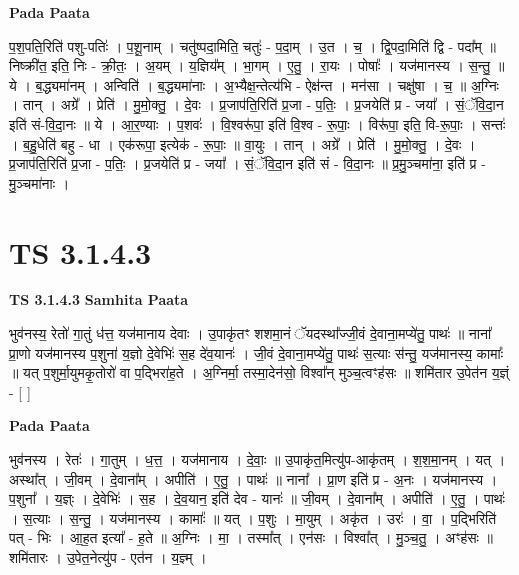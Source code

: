 \documentclass[17pt]{extarticle}
\begin{document}
\textbf{Pada Paata} \newline

प॒श॒पति॒रिति॑ पशु-पतिः॑ । प॒शू॒नाम् । चतु॑ष्पदा॒मिति॒ चतुः॑ - प॒दा॒म् । उ॒त । च॒ । द्वि॒पदा॒मिति॑ द्वि - पदा᳚म् ॥ निष्क्री॑त॒ इति॒ निः - क्री॒तः॒ । अ॒यम् । य॒ज्ञिय᳚म् । भा॒गम् । ए॒तु॒ । रा॒यः । पोषाः᳚ । यज॑मानस्य । स॒न्तु॒ ॥ ये । ब॒द्ध्यमा॑नम् । अन्विति॑ । ब॒द्ध्यमा॑नाः । अ॒भ्यैक्ष॒न्तेत्य॑भि - ऐक्ष॑न्त । मन॑सा । चक्षु॑षा । च॒ ॥ अ॒ग्निः । तान् । अग्रे᳚ । प्रेति॑ । मु॒मो॒क्तु॒ । दे॒वः । प्र॒जाप॑ति॒रिति॑ प्र॒जा - प॒तिः॒ । प्र॒जयेति॑ प्र - जया᳚ । सं॒ॅवि॒दा॒न इति॑ सं-वि॒दा॒नः ॥ ये । आ॒र॒ण्याः । प॒शवः॑ । वि॒श्वरू॑पा॒ इति॑ वि॒श्व - रू॒पाः॒ । विरू॑पा॒ इति॒ वि-रू॒पाः॒ । सन्तः॑ । ब॒हु॒धेति॑ बहु - धा । एक॑रूपा॒ इत्येक॑ - रू॒पाः॒ ॥ वा॒युः । तान् । अग्रे᳚ । प्रेति॑ । मु॒मो॒क्तु॒ । दे॒वः । प्र॒जाप॑ति॒रिति॑ प्र॒जा - प॒तिः॒ । प्र॒जयेति॑ प्र - जया᳚ । सं॒ॅवि॒दा॒न इति॑ सं - वि॒दा॒नः ॥ प्र॒मु॒ञ्चमा॑ना॒ इति॑ प्र - मु॒ञ्चमा॑नाः ।  \newline





\section{ TS 3.1.4.3 }

\textbf{TS 3.1.4.3 } \newline
\textbf{Samhita Paata} \newline

भुव॑नस्य॒ रेतो॑ गा॒तुं ध॑त्त॒ यज॑मानाय देवाः । उ॒पाकृ॑तꣳ शशमा॒नं ॅयदस्था᳚ज्जी॒वं दे॒वाना॒मप्ये॑तु॒ पाथः॑ ॥ नाना᳚ प्रा॒णो यज॑मानस्य प॒शुना॑ य॒ज्ञो दे॒वेभिः॑ स॒ह दे॑व॒यानः॑ । जी॒वं दे॒वाना॒मप्ये॑तु॒ पाथः॑ स॒त्याः स॑न्तु॒ यज॑मानस्य॒ कामाः᳚ ॥ यत् प॒शुर्मा॒युमकृ॒तोरो॑ वा प॒द्भिरा॑ह॒ते । अ॒ग्निर्मा॒ तस्मा॒देन॑सो॒ विश्वा᳚न् मुञ्च॒त्वꣳह॑सः ॥ शमि॑तार उ॒पेत॑न य॒ज्ञ्ं - [  ] \newline

\textbf{Pada Paata} \newline

भुव॑नस्य । रेतः॑ । गा॒तुम् । ध॒त्त॒ । यज॑मानाय । दे॒वाः॒ ॥ उ॒पाकृ॑त॒मित्यु॑प-आकृ॑तम् । श॒श॒मा॒नम् । यत् । अस्था᳚त् । जी॒वम् । दे॒वाना᳚म् । अपीति॑ । ए॒तु॒ । पाथः॑ ॥ नाना᳚ । प्रा॒ण इति॑ प्र - अ॒नः । यज॑मानस्य । प॒शुना᳚ । य॒ज्ञ्ः । दे॒वेभिः॑ । स॒ह । दे॒व॒यान॒ इति॑ देव - यानः॑ ॥ जी॒वम् । दे॒वाना᳚म् । अपीति॑ । ए॒तु॒ । पाथः॑ । स॒त्याः । स॒न्तु॒ । यज॑मानस्य । कामाः᳚ ॥ यत् । प॒शुः । मा॒युम् । अकृ॑त । उरः॑ । वा॒ । प॒द्भिरिति॑ पत् - भिः । आ॒ह॒त इत्या᳚ - ह॒ते ॥ अ॒ग्निः । मा॒ । तस्मा᳚त् । एन॑सः । विश्वा᳚त् । मु॒ञ्च॒तु॒ । अꣳह॑सः ॥ शमि॑तारः । उ॒पेत॒नेत्यु॑प - एत॑न । य॒ज्ञ्म् ।  \newline
\end{document}
